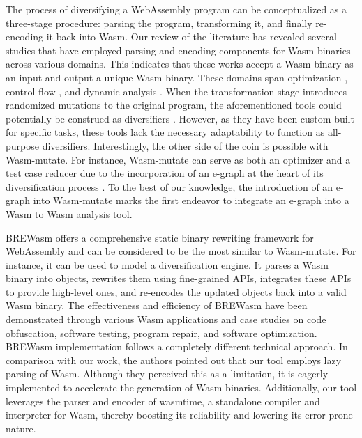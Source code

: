 \documentclass[sigplan,screen]{acmart}
\newcommand*\badge[1]{ \colorbox{red}{\color{white}#1}}
\newcommand{\tool}{Wasm-mutate\xspace}
\newcommand{\wasm}{Wasm\xspace}
\newcommand{\Wasm}{WebAssembly\xspace}
\newcommand{\todo}[1]{%
\refstepcounter{todo}
\noindent\textbf{\badge{TODO}} {\color{red}#1}
\addcontentsline{td}{todo}
{\color{red}\thesection.\thetodo\xspace #1}}
\begin{document}
The process of diversifying a \Wasm program can be conceptualized as a three-stage procedure: parsing the program, transforming it, and finally re-encoding it back into \wasm. 
Our review of the literature has revealed several studies that have employed parsing and encoding components for \wasm binaries across various domains. 
This indicates that these works accept a \wasm binary as an input and output a unique \wasm binary. 
These domains span optimization \cite{wasmslim}, control flow \cite{10123627}, and dynamic analysis \cite{wasabi, stievenart2020compositional, 10123627, BRITO2022102745}.
When the transformation stage introduces randomized mutations to the original program, the aforementioned tools could potentially be construed as diversifiers \cite{some paper claming this}.
However, as they have been custom-built for specific tasks, these tools lack the necessary adaptability to function as all-purpose diversifiers. 
Interestingly, the other side of the coin is possible with \tool.
For instance, \tool can serve as both an optimizer and a test case reducer due to the incorporation of an e-graph at the heart of its diversification process \cite{10.1145/1480881.1480915}. 
To the best of our knowledge, the introduction of an e-graph into \tool marks the first endeavor to integrate an e-graph into a \wasm to \wasm analysis tool.




BREWasm \cite{rewritingtool2023} offers a comprehensive static binary rewriting framework for \Wasm and can be considered to be the most similar to \tool. 
For instance, it can be used to model a diversification engine.
It parses a Wasm binary into objects, rewrites them using fine-grained APIs, integrates these APIs to provide high-level ones, and re-encodes the updated objects back into a valid Wasm binary. 
The effectiveness and efficiency of BREWasm have been demonstrated through various Wasm applications and case studies on code obfuscation, software testing, program repair, and software optimization. 
BREWasm implementation follows a completely different technical approach.
In comparison with our work, the authors pointed out that our tool employs lazy parsing of Wasm. 
Although they perceived this as a limitation, it is eagerly implemented to accelerate the generation of \wasm binaries.
Additionally, our tool leverages the parser and encoder of wasmtime, a standalone compiler and interpreter for Wasm, thereby boosting its reliability and lowering its error-prone nature.
\end{document}
